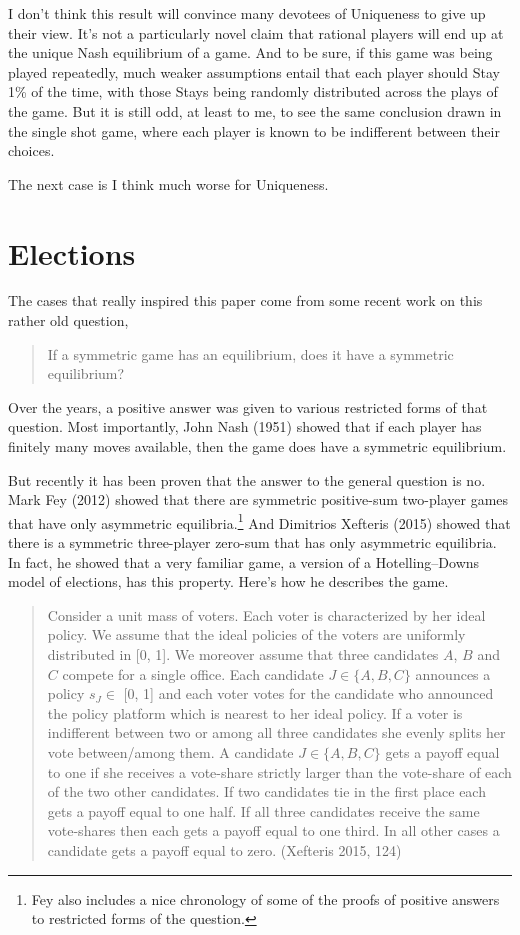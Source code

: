 \documentclass[12pt,]{article}
\let\rmarkdownfootnote\footnote%
\def\footnote{\protect\rmarkdownfootnote}
\begin{document}
I don't think this result will convince many devotees of Uniqueness to give up their view. It's not a particularly novel claim that rational players will end up at the unique Nash equilibrium of a game. And to be sure, if this game was being played repeatedly, much weaker assumptions entail that each player should Stay 1\% of the time, with those Stays being randomly distributed across the plays of the game. But it is still odd, at least to me, to see the same conclusion drawn in the single shot game, where each player is known to be indifferent between their choices.

The next case is I think much worse for Uniqueness.

\hypertarget{elections}{%
\section{Elections}\label{elections}}

The cases that really inspired this paper come from some recent work on this rather old question,

\begin{quote}
If a symmetric game has an equilibrium, does it have a symmetric equilibrium?
\end{quote}

Over the years, a positive answer was given to various restricted forms of that question. Most importantly, John Nash (1951) showed that if each player has finitely many moves available, then the game does have a symmetric equilibrium.

But recently it has been proven that the answer to the general question is no. Mark Fey (2012) showed that there are symmetric positive-sum two-player games that have only asymmetric equilibria.\footnote{Fey also includes a nice chronology of some of the proofs of positive answers to restricted forms of the question.} And Dimitrios Xefteris (2015) showed that there is a symmetric three-player zero-sum that has only asymmetric equilibria. In fact, he showed that a very familiar game, a version of a Hotelling--Downs model of elections, has this property. Here's how he describes the game.

\begin{quote}
Consider a unit mass of voters. Each voter is characterized by her ideal policy. We assume that the ideal policies of the voters are uniformly distributed in {[}0, 1{]}. We moreover assume that three candidates \(A\), \(B\) and \(C\) compete for a single office. Each candidate \(J \in \{A, B, C\}\) announces a policy \(s_J \in\) {[}0, 1{]} and each voter votes for the candidate who announced the policy platform which is nearest to her ideal policy. If a voter is indifferent between two or among all three candidates she evenly splits her vote between/among them. A candidate \(J \in \{A, B, C\}\) gets a payoff equal to one if she receives a vote-share strictly larger than the vote-share of each of the two other candidates. If two candidates tie in the first place each gets a payoff equal to one half. If all three candidates receive the same vote-shares then each gets a payoff equal to one third. In all other cases a candidate gets a payoff equal to zero. (Xefteris 2015, 124)
\end{quote}
\end{document}
